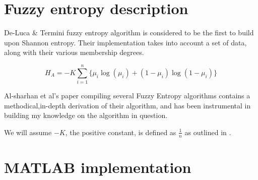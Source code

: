 \documentclass[11pt,fleqn,twoside]{article}
\begin{document}
\wordcount{}

\mmp

\setcounter{tocdepth}{3} %


\section{Fuzzy entropy description}
\label{sec:desc}

De-Luca \& Termini fuzzy entropy algorithm \cite{DeLuca_Termini_1972} is considered to be the first to build upon Shannon entropy. Their implementation takes into account a set of data, along with their various membership degrees.


\begin{equation}
  \label{eq:de-luca}
  H_A = -K \displaystyle\sum_{i=1}^{n}{\{\mu_i\log(\mu_i) + (1 - \mu_i)\log(1 - \mu_i)\}}
\end{equation}

Al-sharhan et al's paper compiling several Fuzzy Entropy algorithms \cite{Al-Sharhan_Karray_Gueaieb_Basir_2001} contains a methodical,in-depth derivation of their algorithm, and has been instrumental in building my knowledge on the algorithm in question.

We will assume $-K$, the positive constant, is defined as $\frac{1}{n}$ as outlined in \cite{DeLuca_Termini_1972}.

\section{MATLAB implementation}
\end{document}
